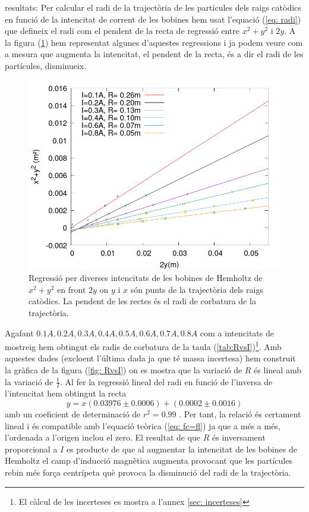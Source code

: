 \documentclass[11pt]{article}
\begin{document}
resultats:
Per calcular el radi de la trajectòria de les partícules dels raigs catòdics en funció de la intencitat de corrent de les bobines hem usat l'equació (\ref{eq: radi}) que defineix el radi com el pendent de la recta de regressió entre $x^2+y^2$ i $2y$. A la figura (\ref{fig: regressio_1}) hem representat algunes d'aquestes regressions i ja podem veure com a mesura que augmenta la intencitat, el pendent de la recta, és a dir el radi de les partícules, disminueix. 
\begin{figure}[H]
    \centering
    \includegraphics[scale=0.3]{regressio_1.png}
    \caption{Regressió per diverses intencitats de les bobines de Hemholtz de $x^2+y^2$ en front $2y$ on $y$ i $x$ són punts de la trajectòria dels raigs catòdics. La pendent de les rectes és el radi de corbatura de la trajectòria.}
    \label{fig: regressio_1}
\end{figure}

Agafant $0.1A, 0.2A, 0.3A, 0.4A, 0.5A, 0.6A, 0.7A, 0.8A$ com a intencitats de mostreig hem obtingut els radis de corbatura de la taula (\ref{tab:RvsI})\footnote{El càlcul de les incerteses es mostra a l'annex \ref{sec: incerteses}}. Amb aquestes dades (excloent l'última dada ja que té massa incertesa) hem construit la gràfica de la figura (\ref{fig: RvsI}) on es mostra que la variació de $R$ és lineal amb la variació de $\frac{1}{I}$. 
Al fer la regressió lineal del radi en funció de l'inversa de l'intencitat hem obtingut la recta
\begin{equation}
    y=x(0.03976\pm0.0006)+(0.0002\pm0.0016)
\end{equation}  
amb un coeficient de determinació de $r^2=0.99$ . Per tant, la relació és certament lineal i és compatible amb l'equació teòrica (\ref{eq: fc=fl}) ja que a més a més, l'ordenada a l'origen inclou el zero. El resultat de que $R$ és inversament proporcional a $I$ es producte de que al augmentar la intencitat de les bobines de Hemholtz el camp d'inducció magnètica augmenta provocant que les partícules rebin més força centrípeta què provoca la disminució del radi de la trajectòria.
\end{document}
